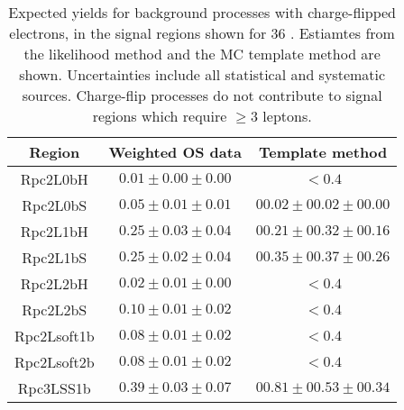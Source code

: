 \begin{table}[!htb]
\caption{Expected yields for background processes with charge-flipped electrons,
in the signal regions shown for 36 \ifb. 
Estiamtes from the likelihood method and the MC template method are shown.
Uncertainties include all statistical and systematic sources. 
Charge-flip processes do not contribute to signal regions which require $\ge 3$ leptons. 
}
\label{tab:chflips_sr_yields}
\centering
\begin{tabular}{|c||c|c|}\hline
 Region      &   Weighted OS data          &     Template method \\\hline
    Rpc2L0bH & $ 0.01 \pm  0.00 \pm  0.00$ & $<0.4$ \\
    Rpc2L0bS & $ 0.05 \pm  0.01 \pm  0.01$ & $ 00.02 \pm 00.02 \pm 00.00 $ \\
    Rpc2L1bH & $ 0.25 \pm  0.03 \pm  0.04$ & $ 00.21 \pm 00.32 \pm 00.16 $ \\
    Rpc2L1bS & $ 0.25 \pm  0.02 \pm  0.04$ & $ 00.35 \pm 00.37 \pm 00.26 $ \\
    Rpc2L2bH & $ 0.02 \pm  0.01 \pm  0.00$ & $<0.4$ \\
    Rpc2L2bS & $ 0.10 \pm  0.01 \pm  0.02$ & $<0.4$ \\
 Rpc2Lsoft1b & $ 0.08 \pm  0.01 \pm  0.02$ & $<0.4$ \\
 Rpc2Lsoft2b & $ 0.08 \pm  0.01 \pm  0.02$ & $<0.4$ \\
   Rpc3LSS1b & $ 0.39 \pm  0.03 \pm  0.07$ & $ 00.81 \pm 00.53 \pm 00.34 $ \\
\hline
\hline
\end{tabular}
\end{table}


\begin{table}[!htb]
\caption{Comparison of expected yields for background processes with fake leptons,
in the validation regions, shown for 36 \ifb~between the data driven (DD) estimates and the MC template method (MC) estimates. 
}
\label{tab:VR_Comparison}
\def\arraystretch{1.1}
\centering
{}
\end{table}
